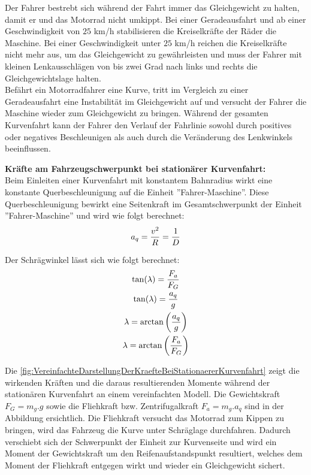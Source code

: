 Der Fahrer bestrebt sich während der Fahrt immer das Gleichgewicht zu halten, damit er und das Motorrad nicht umkippt. Bei einer Geradeausfahrt und ab einer Geschwindigkeit von $25$ km/h stabilisieren die Kreiselkräfte der Räder die Maschine. Bei einer Geschwindigkeit unter $25$ km/h reichen die Kreiselkräfte nicht mehr aus, um das Gleichgewicht zu gewährleisten und muss der Fahrer mit kleinen Lenkausschlägen von bis zwei Grad nach links und rechts die Gleichgewichtslage halten.\\
Befährt ein Motorradfahrer eine Kurve, tritt im Vergleich zu einer Geradeausfahrt eine Instabilität im Gleichgewicht auf und versucht der Fahrer die Maschine wieder zum Gleichgewicht zu bringen. Während der gesamten Kurvenfahrt kann der Fahrer den Verlauf der Fahrlinie sowohl durch positives oder negatives Beschleunigen als auch durch die Veränderung des Lenkwinkels beeinflussen.


\textbf{Kräfte am Fahrzeugschwerpunkt bei stationärer Kurvenfahrt:}\\
Beim Einleiten einer Kurvenfahrt mit konstantem Bahnradius wirkt eine konstante Querbeschleunigung auf die Einheit ''Fahrer-Maschine''. Diese Querbeschleunigung bewirkt eine Seitenkraft im Gesamtschwerpunkt der Einheit ''Fahrer-Maschine'' und wird wie folgt berechnet:
\begin{align}
	\centering
	a_q = \frac{v^2}{R} = \frac{1}{D}
	\label{gl:Querbeschleunigung}
\end{align}

Der Schrägwinkel lässt sich wie folgt berechnet:
\begin{equation}
	\centering
	\begin{gathered}
		\tan(\lambda)  =  \frac{F_a}{F_G} \\
		\tan(\lambda)  =  \frac{a_q}{g} \\
		\lambda  =  \arctan\left(\frac{a_q}{g}\right) \\
		\lambda  =  \arctan \left(\frac{F_a}{F_G}\right)
		\label{gl:Schraegwinkel}
	\end{gathered}
\end{equation}


Die \autoref{fig:VereinfachteDarstellungDerKraefteBeiStationaererKurvenfahrt} zeigt die wirkenden Kräften und die daraus resultierenden Momente während der stationären Kurvenfahrt an einem vereinfachten Modell. Die Gewichtskraft $F_G = m_g . g$ sowie die Fliehkraft bzw. Zentrifugalkraft $F_a = m_g . a_q$ sind in der Abbildung ersichtlich. Die Fliehkraft versucht das Motorrad zum Kippen zu bringen, wird das Fahrzeug die Kurve unter Schräglage durchfahren. Dadurch verschiebt sich der Schwerpunkt der Einheit zur Kurvenseite und wird ein Moment der Gewichtskraft um den Reifenaufstandspunkt resultiert, welches dem Moment der Fliehkraft entgegen wirkt und wieder ein Gleichgewicht sichert.


